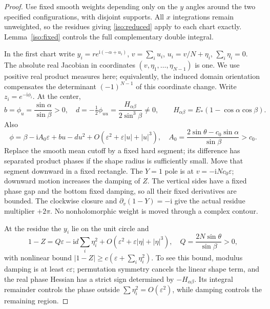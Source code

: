 \documentclass[11pt]{article}
\numberwithin{equation}{section}
\theoremstyle{definition}
\newcommand{\ii}{\mathrm i}
\newcommand{\eps}{\varepsilon}
\begin{document}
\begin{proof}
Use fixed smooth weights depending only on the $y$ angles around the two
specified configurations, with disjoint supports. All $x$ integrations
remain unweighted, so the residues giving \eqref{iso:reduced} apply to
each chart exactly. Lemma~\ref{iso:fixed} controls the full complementary
double integral.

In the first chart write
$y_i=r e^{\ii(-\alpha+u_i)}$, $v=\sum_i u_i$,
$u_i=v/N+\eta_i$, $\sum_i\eta_i=0$.
The absolute real Jacobian in coordinates
$(v,\eta_1,\ldots,\eta_{N-1})$ is one. We use positive real product
measures here; equivalently, the induced domain orientation compensates
the determinant $(-1)^{N-1}$ of this coordinate change.
Write $z_i=e^{-\ii\phi_i}$. At the center,
\[
 b=\phi_u=\frac{\sin\alpha}{\sin\beta}>0,\quad
 d=-\tfrac12\phi_{uu}
 =\frac{H_{\alpha\beta}}{2\sin^3\beta}\ne0,\qquad
 H_{\alpha\beta}=E_*(1-\cos\alpha\cos\beta).
\]
Also
\[
 \phi=\beta-\ii A_0\eps+bu-du^2+
 O(\eps^2+\eps|u|+|u|^3),\quad
 A_0=\frac{2\sin\theta-c_0\sin\alpha}{\sin\beta}>c_0.
\]
Replace the smooth mean cutoff by a fixed hard segment; its difference
has separated product phases if the shape radius is sufficiently small.
Move that segment downward in a fixed rectangle. The $Y=1$ pole is at
$v=-\ii Nc_0\eps$; downward motion increases the damping of $Z$.
The vertical sides have a fixed phase gap and the bottom fixed damping,
so all their fixed derivatives are bounded. The clockwise closure and
$\partial_v(1-Y)=-\ii$ give the actual residue multiplier $+2\pi$.
No nonholomorphic weight is moved through a complex contour.

At the residue the $y_i$ lie on the unit circle and
\begin{equation}
 1-Z=Q\eps-\ii d\sum_i\eta_i^2+
 O(\eps^2+\eps|\eta|+|\eta|^3),\quad
 Q=\frac{2N\sin\theta}{\sin\beta}>0,
 \label{iso:first-denominator}
\end{equation}
with nonlinear bound $|1-Z|\ge c(\eps+\sum_i\eta_i^2)$.
To see this bound, modulus damping is at least $c\eps$; permutation
symmetry cancels the linear shape term, and the real phase Hessian has a
strict sign determined by $-H_{\alpha\beta}$. Its integral remainder
controls the phase outside $\sum\eta_i^2=O(\eps^2)$, while damping
controls the remaining region.


\end{proof}
\end{document}
